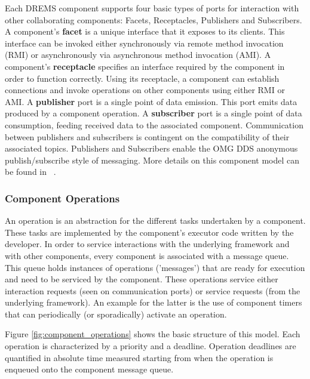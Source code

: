 Each DREMS component supports four basic types of ports for interaction with other collaborating components: Facets, Receptacles, Publishers and Subscribers. A component's {\bf facet} is a unique interface that it exposes to its clients. This interface can be invoked either synchronously via remote method invocation (RMI) or asynchronously via asynchronous method invocation (AMI). A component's {\bf receptacle} specifies an interface required by the component in order to function correctly. Using its receptacle, a component can establish connections and invoke operations on other components using either RMI or AMI. A {\bf publisher} port is a single point of data emission. This port emits data produced by a component operation. A {\bf subscriber} port is a single point of data consumption, feeding received data to the associated component. Communication between publishers and subscribers is contingent on the compatibility of their associated topics. Publishers and Subscribers enable the OMG DDS anonymous publish/subscribe style of messaging. More details on this component model can be found in ~\cite{ISIS_F6_ISORC:13}.



\subsubsection{Component Operations}
\label{sec:component_operations}
An operation is an abstraction for the different tasks undertaken by a component. These tasks are implemented by the component's executor code written by the developer. In order to service interactions with the underlying framework and with other components, every component is associated with a message queue. This queue holds instances of operations ('messages') that are ready for execution and need to be serviced by the component. These operations service either interaction requests (seen on communication ports) or service requests (from the underlying framework). An example for the latter is the use of component timers that can periodically (or sporadically) activate an operation. 

Figure \ref{fig:component_operations} shows the basic structure of this model. Each operation is characterized by a priority and a deadline. Operation deadlines are quantified in absolute time measured starting from when the operation is enqueued onto the component message queue. %

